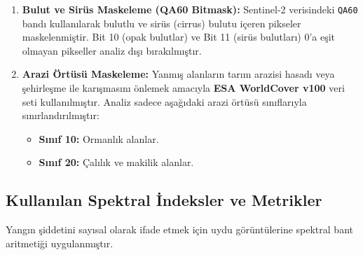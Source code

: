 \documentclass[11pt,a4paper]{article}
\begin{document}
\begin{enumerate}
    \item \textbf{Bulut ve Sirüs Maskeleme (QA60 Bitmask):} Sentinel-2 verisindeki \texttt{QA60} bandı kullanılarak bulutlu ve sirüs (cirrus) bulutu içeren pikseler maskelenmiştir. Bit 10 (opak bulutlar) ve Bit 11 (sirüs bulutları) 0'a eşit olmayan pikseller analiz dışı bırakılmıştır.
    \item \textbf{Arazi Örtüsü Maskeleme:} Yanmış alanların tarım arazisi hasadı veya şehirleşme ile karışmasını önlemek amacıyla \textbf{ESA WorldCover v100} veri seti kullanılmıştır. Analiz sadece aşağıdaki arazi örtüsü sınıflarıyla sınırlandırılmıştır:
    \begin{itemize}
        \item \textbf{Sınıf 10:} Ormanlık alanlar.
        \item \textbf{Sınıf 20:} Çalılık ve makilik alanlar.
    \end{itemize}
\end{enumerate}

\subsection{Kullanılan Spektral İndeksler ve Metrikler}
Yangın şiddetini sayısal olarak ifade etmek için uydu görüntülerine spektral bant aritmetiği uygulanmıştır.
\end{document}
